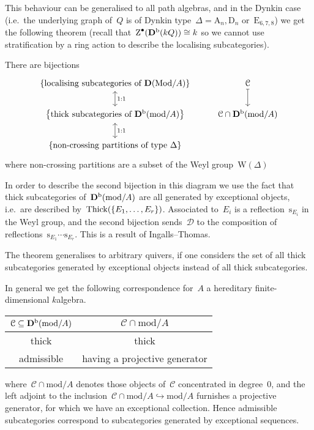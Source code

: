 \documentclass[10pt,a4paper]{article}
\begin{document}
This behaviour can be generalised to all path algebras, and in the Dynkin case (i.e.\ the underlying graph of~$Q$ is of Dynkin type~$\Delta=\mathrm{A}_n,\mathrm{D}_n$ or~$\mathrm{E}_{6,7,8}$) we get the following theorem (recall that~$\operatorname{Z}^\bullet(\mathbf{D}^{\mathrm{b}}(kQ))\cong k$ so we cannot use stratification by a ring action to describe the localising subcategories).
\begin{theorem}
  There are bijections
  \begin{equation}
    \begin{tikzcd}
      \left\{ \text{localising subcategories of $\derived(\Mod/A)$} \right\} \arrow[leftrightarrow]{d}{1:1} & \mathcal{C} \arrow[mapsto]{d} \\
      \left\{ \text{thick subcategories of $\derived^\bounded(\mathrm{mod}/A)$} \right\} \arrow[leftrightarrow]{d}{1:1} & \mathcal{C}\cap\derived^\bounded(\mathrm{mod}/A) \\
      \left\{ \text{non-crossing partitions of type~$\Delta$} \right\}
    \end{tikzcd}
  \end{equation}
  where non-crossing partitions are a subset of the Weyl group~$\mathrm{W}(\Delta)$
\end{theorem}

In order to describe the second bijection in this diagram we use the fact that thick subcategories of~$\mathbf{D}^{\mathrm{b}}(\mathrm{mod}/A)$ are all generated by exceptional objects, i.e.\ are described by~$\operatorname{Thick}(\{E_1,\dotsc,E_r\})$. Associated to~$E_i$ is a reflection~$\mathrm{s}_{E_i}$ in the Weyl group, and the second bijection sends~$\mathcal{D}$ to the composition of reflections~$\mathrm{s}_{E_1}\dotsm\mathrm{s}_{E_r}$. This is a result of Ingalls--Thomas.

\begin{remark}
  The theorem generalises to arbitrary quivers, if one considers the set of all thick subcategories generated by exceptional objects instead of all thick subcategories.

  In general we get the following correspondence for~$A$ a hereditary finite-dimensional $k$\dash algebra.

  \begin{center}
    \begin{tabular}{cc}
      \toprule
      $\mathcal{C}\subseteq\mathbf{D}^{\mathrm{b}}(\mathrm{mod}/A)$ & $\mathcal{C}\cap\mathrm{mod}/A$ \\\midrule
      thick & thick \\
      admissible & having a projective generator \\
      \bottomrule
    \end{tabular}
  \end{center}

  where~$\mathcal{C}\cap\mathrm{mod}/A$ denotes those objects of~$\mathcal{C}$ concentrated in degree~0, and the left adjoint to the inclusion~$\mathcal{C}\cap\mathrm{mod}/A\hookrightarrow\mathrm{mod}/A$ furnishes a projective generator, for which we have an exceptional collection. Hence admissible subcategories correspond to subcategories generated by exceptional sequences.
\end{remark}
\end{document}
